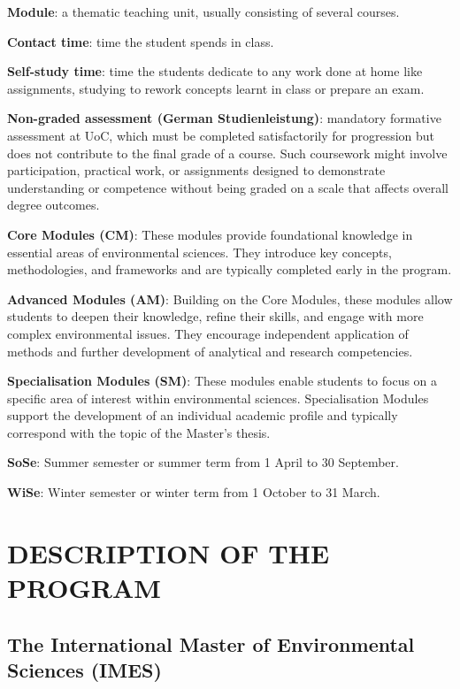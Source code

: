 \documentclass[
  letterpaper,
  10pt,
  openany]{book}
\begin{document}
\textbf{Module}: a thematic teaching unit, usually consisting of several
courses.

\textbf{Contact time}: time the student spends in class.

\textbf{Self-study time}: time the students dedicate to any work done at
home like assignments, studying to rework concepts learnt in class or
prepare an exam.

\textbf{Non-graded assessment (German Studienleistung)}: mandatory
formative assessment at UoC, which must be completed satisfactorily for
progression but does not contribute to the final grade of a course. Such
coursework might involve participation, practical work, or assignments
designed to demonstrate understanding or competence without being graded
on a scale that affects overall degree outcomes.

\textbf{Core Modules (CM)}: These modules provide foundational knowledge
in essential areas of environmental sciences. They introduce key
concepts, methodologies, and frameworks and are typically completed
early in the program.

\textbf{Advanced Modules (AM)}: Building on the Core Modules, these
modules allow students to deepen their knowledge, refine their skills,
and engage with more complex environmental issues. They encourage
independent application of methods and further development of analytical
and research competencies.

\textbf{Specialisation Modules (SM)}: These modules enable students to
focus on a specific area of interest within environmental sciences.
Specialisation Modules support the development of an individual academic
profile and typically correspond with the topic of the Master's thesis.

\textbf{SoSe}: Summer semester or summer term from 1 April to 30
September.

\textbf{WiSe}: Winter semester or winter term from 1 October to 31
March.

\part{DESCRIPTION OF THE PROGRAM}

\chapter*{The International Master of Environmental Sciences
(IMES)}\label{the-international-master-of-environmental-sciences-imes}
\end{document}
